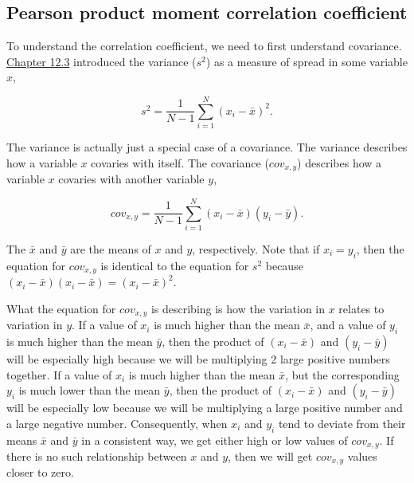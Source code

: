 \documentclass[
  openany]{scrbook}
\begin{document}
\hypertarget{pearson-product-moment-correlation-coefficient}{%
\subsection{Pearson product moment correlation coefficient}\label{pearson-product-moment-correlation-coefficient}}

To understand the correlation coefficient, we need to first understand covariance.
\protect\hyperlink{the-variance}{Chapter 12.3} introduced the variance (\(s^{2}\)) as a measure of spread in some variable \(x\),

\[s^{2} = \frac{1}{N - 1}\sum_{i = 1}^{N}\left(x_{i} - \bar{x} \right)^{2}.\]

The variance is actually just a special case of a covariance.
The variance describes how a variable \(x\) covaries with itself.
The covariance (\(cov_{x,y}\)) describes how a variable \(x\) covaries with another variable \(y\),

\[cov_{x, y} = \frac{1}{N - 1} \sum_{i = 1}^{N}\left(x_{i} - \bar{x} \right) \left(y_{i} - \bar{y} \right).\]

The \(\bar{x}\) and \(\bar{y}\) are the means of \(x\) and \(y\), respectively.
Note that if \(x_{i} = y_{i}\), then the equation for \(cov_{x,y}\) is identical to the equation for \(s^{2}\) because \(\left(x_{i} - \bar{x} \right) \left(x_{i} - \bar{x} \right) = \left(x_{i} - \bar{x} \right)^{2}\).

What the equation for \(cov_{x,y}\) is describing is how the variation in \(x\) relates to variation in \(y\).
If a value of \(x_{i}\) is much higher than the mean \(\bar{x}\), and a value of \(y_{i}\) is much higher than the mean \(\bar{y}\), then the product of \(\left(x_{i} - \bar{x} \right)\) and \(\left(y_{i} - \bar{y} \right)\) will be especially high because we will be multiplying 2 large positive numbers together.
If a value of \(x_{i}\) is much higher than the mean \(\bar{x}\), but the corresponding \(y_{i}\) is much lower than the mean \(\bar{y}\), then the product of \(\left(x_{i} - \bar{x} \right)\) and \(\left(y_{i} - \bar{y} \right)\) will be especially low because we will be multiplying a large positive number and a large negative number.
Consequently, when \(x_{i}\) and \(y_{i}\) tend to deviate from their means \(\bar{x}\) and \(\bar{y}\) in a consistent way, we get either high or low values of \(cov_{x,y}\).
If there is no such relationship between \(x\) and \(y\), then we will get \(cov_{x,y}\) values closer to zero.
\end{document}
